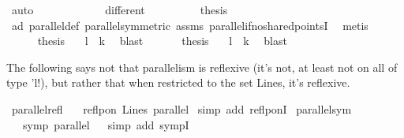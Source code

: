 \begin{isabellebody}
\ auto\isanewline
\ \ \ \ \isamarkupfalse%
\isanewline
\ \ \ \ \ \ \isamarkupfalse%
\ different\isanewline
\ \ \ \ \ \ \isamarkupfalse%
\ \isamarkupfalse%
\ {\isacharquery}{\kern0pt}thesis\ \isamarkupfalse%
\ a{}d\ parallel{\isacharunderscore}{\kern0pt}def\ parallel{\isacharunderscore}{\kern0pt}symmetric\ assms\ parallel{\isacharunderscore}{\kern0pt}if{\isacharunderscore}{\kern0pt}no{\isacharunderscore}{\kern0pt}shared{\isacharunderscore}{\kern0pt}pointsI\ \isamarkupfalse%
\ metis\isanewline
\ \ \ \ \isamarkupfalse%
\isanewline
\ \ \ \ \isamarkupfalse%
\ {\isacharquery}{\kern0pt}thesis\ \ \isamarkupfalse%
\ {\isacartoucheopen}l\ {\isacharbar}{\kern0pt}{\isacharbar}{\kern0pt}\ k{\isacartoucheclose}\ \isamarkupfalse%
\ blast\isanewline
\ \ \isamarkupfalse%
\isanewline
\ \ \isamarkupfalse%
\ {\isacharquery}{\kern0pt}thesis\ \ \isamarkupfalse%
\ {\isacartoucheopen}l\ {\isacharbar}{\kern0pt}{\isacharbar}{\kern0pt}\ k{\isacartoucheclose}\ \isamarkupfalse%
\ blast\isanewline
{}\isamarkupfalse%
%
\endisatagproof
{\isafoldproof}%
%
\isadelimproof
%
\endisadelimproof
%
\begin{isamarkuptext}%
The following says not that parallelism is reflexive (it's not, at least not on all of type 'l!), 
but rather that when restricted to the set Lines, it's reflexive.%
\end{isamarkuptext}\isamarkuptrue%
\isamarkupfalse%
\ parallel{\isacharunderscore}{\kern0pt}refl{\isacharcolon}{\kern0pt}\isanewline
\ \ \ {\isachardoublequoteopen}reflp{\isacharunderscore}{\kern0pt}on\ Lines\ parallel{\isachardoublequoteclose}\isanewline
%
\isadelimproof
%
\endisadelimproof
%
\isatagproof
{}\isamarkupfalse%
\ {\isacharparenleft}{\kern0pt}simp\ add{\isacharcolon}{\kern0pt}\ reflp{\isacharunderscore}{\kern0pt}onI{\isacharparenright}{\kern0pt}%
\endisatagproof
{\isafoldproof}%
%
\isadelimproof
\isanewline
%
\endisadelimproof
\isanewline
{}\isamarkupfalse%
\ parallel{\isacharunderscore}{\kern0pt}sym{\isacharcolon}{\kern0pt}\isanewline
\ \ \ {\isachardoublequoteopen}symp\ parallel{\isachardoublequoteclose}%
\isadelimproof
\ %
\endisadelimproof
%
\isatagproof
{}\isamarkupfalse%
\ {\isacharparenleft}{\kern0pt}simp\ add{\isacharcolon}{\kern0pt}\ sympI{\isacharparenright}{\kern0pt}%

\end{isabellebody}
